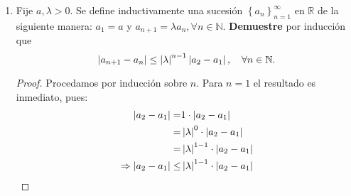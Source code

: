 \documentclass[12pt]{article}
\begin{document}
\begin{enumerate}
\begin{proof}
        Luego, sustituyendo en (1):
        \begin{equation*}
            \begin{split}
                \Rightarrow \abs{a_{k+2}-a_{k+1}}\leq&\alpha\left(\frac{\alpha}{\alpha+1}\right)^{k-1}{\frac{1}{\abs{(1+a_{k})(1+a_{k+1})}}}\abs{a_2-a_1}\\
                \leq&\alpha\left(\frac{\alpha}{\alpha+1}\right)^{k-1}\frac{1}{\alpha+1}\abs{a_2-a_1}\\
                =&\left(\frac{\alpha}{\alpha+1}\right)^{k-1}\frac{\alpha}{\alpha+1}\abs{a_2-a_1}\\
                =&\left(\frac{\alpha}{\alpha+1}\right)^{k}\abs{a_2-a_1}\\
                =&\left(\frac{\alpha}{\alpha+1}\right)^{(k+1)-1}\abs{a_2-a_1}\\
                \Rightarrow \abs{a_{k+2}-a_{k+1}}\leq&\left(\frac{\alpha}{\alpha+1}\right)^{(k+1)-1}\abs{a_2-a_1}
            \end{split}
        \end{equation*}
        De esta forma, el resultado se cumple para $n=k+1$. Aplicando inducción, el resultado se cumple para toda $n\in\mathbb{N}$.
        \qed
    \end{proof}
    \item Fije $a,\lambda>0$. Se define inductivamente una sucesión $\left\{a_n\right\}^{\infty}_{n=1}$ en $\mathbb{R}$ de la siguiente manera: $a_1 = a$ y $a_{n+1}=\lambda a_{n}, \forall n\in\mathbb{N}$. \textbf{Demuestre} por inducción que
    \begin{equation*}
        \left| a_{n+1}-a_n \right|\leq\left| \lambda \right|^{n-1}\left| a_2-a_1 \right|, \quad \forall n\in\mathbb{N}.
    \end{equation*}
    \begin{proof}
        Procedamos por inducción sobre $n$. Para $n=1$ el resultado es inmediato, pues:
        \begin{equation*}
            \begin{split}
                \left| a_2-a_1 \right|=& 1\cdot \left| a_2-a_1 \right|\\
                =& \left| \lambda \right|^0\cdot \left| a_2-a_1 \right|\\
                =& \left| \lambda \right|^{1-1}\cdot \left| a_2-a_1 \right|\\
                \Rightarrow \left| a_2-a_1 \right|\leq&\left| \lambda \right|^{1-1}\cdot \left| a_2-a_1 \right|
            \end{split}
        \end{equation*}

\end{proof}
\end{enumerate}
\end{document}
